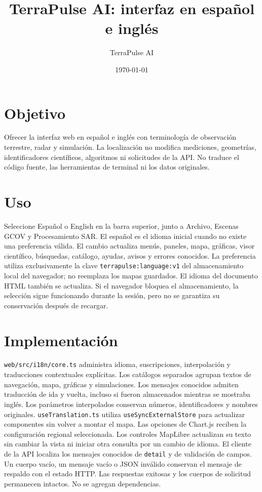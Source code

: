 \documentclass[11pt]{article}
\title{TerraPulse AI: interfaz en español e inglés}
\author{TerraPulse AI}
\date{\today}
\begin{document}
\maketitle
\section{Objetivo}
Ofrecer la interfaz web en español e inglés con terminología de observación
terrestre, radar y simulación. La localización no modifica mediciones,
geometrías, identificadores científicos, algoritmos ni solicitudes de la API.
No traduce el código fuente, las herramientas de terminal ni los datos originales.
\section{Uso}
Seleccione Español o English en la barra superior, junto a Archivo,
Escenas GCOV y Procesamiento SAR. El español es el idioma inicial cuando no
existe una preferencia válida. El cambio actualiza menús, paneles, mapa,
gráficas, visor científico, búsquedas, catálogo, ayudas, avisos y errores conocidos.
La preferencia utiliza exclusivamente la clave
\texttt{terrapulse:language:v1} del almacenamiento local del navegador;
no reemplaza los mapas guardados. El idioma del documento HTML también se actualiza.
Si el navegador bloquea el almacenamiento, la selección sigue funcionando
durante la sesión, pero no se garantiza su conservación después de recargar.
\section{Implementación}
\texttt{web/src/i18n/core.ts} administra idioma, suscripciones, interpolación
y traducciones contextuales explícitas. Los catálogos separados agrupan textos
de navegación, mapa, gráficas y simulaciones. Los mensajes conocidos admiten
traducción de ida y vuelta, incluso si fueron almacenados mientras se mostraba inglés.
Los parámetros interpolados conservan números, identificadores y nombres originales.
\texttt{useTranslation.ts} utiliza \texttt{useSyncExternalStore} para actualizar
componentes sin volver a montar el mapa. Las opciones de Chart.js reciben la
configuración regional seleccionada. Los controles MapLibre actualizan su texto
sin cambiar la vista ni iniciar otra consulta por un cambio de idioma.
El cliente de la API localiza los mensajes conocidos de \texttt{detail} y de
validación de campos. Un cuerpo vacío, un mensaje vacío o JSON inválido conservan
el mensaje de respaldo con el estado HTTP. Las respuestas exitosas y los cuerpos
de solicitud permanecen intactos. No se agregan dependencias.
\end{document}
